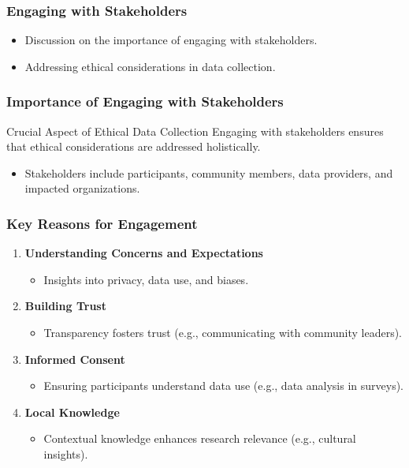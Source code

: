 \documentclass{beamer}
\begin{document}
\begin{frame}[fragile]
    \frametitle{Engaging with Stakeholders}
    \begin{itemize}
        \item Discussion on the importance of engaging with stakeholders.
        \item Addressing ethical considerations in data collection.
    \end{itemize}
\end{frame}

\begin{frame}[fragile]
    \frametitle{Importance of Engaging with Stakeholders}
    \begin{block}{Crucial Aspect of Ethical Data Collection}
        Engaging with stakeholders ensures that ethical considerations are addressed holistically. 
    \end{block}
    \begin{itemize}
        \item Stakeholders include participants, community members, data providers, and impacted organizations.
    \end{itemize}
\end{frame}

\begin{frame}[fragile]
    \frametitle{Key Reasons for Engagement}
    \begin{enumerate}
        \item \textbf{Understanding Concerns and Expectations}
            \begin{itemize}
                \item Insights into privacy, data use, and biases.
            \end{itemize}
        \item \textbf{Building Trust}
            \begin{itemize}
                \item Transparency fosters trust (e.g., communicating with community leaders).
            \end{itemize}
        \item \textbf{Informed Consent}
            \begin{itemize}
                \item Ensuring participants understand data use (e.g., data analysis in surveys).
            \end{itemize}
        \item \textbf{Local Knowledge}
            \begin{itemize}
                \item Contextual knowledge enhances research relevance (e.g., cultural insights).
            \end{itemize}
    \end{enumerate}
\end{frame}
\end{document}
